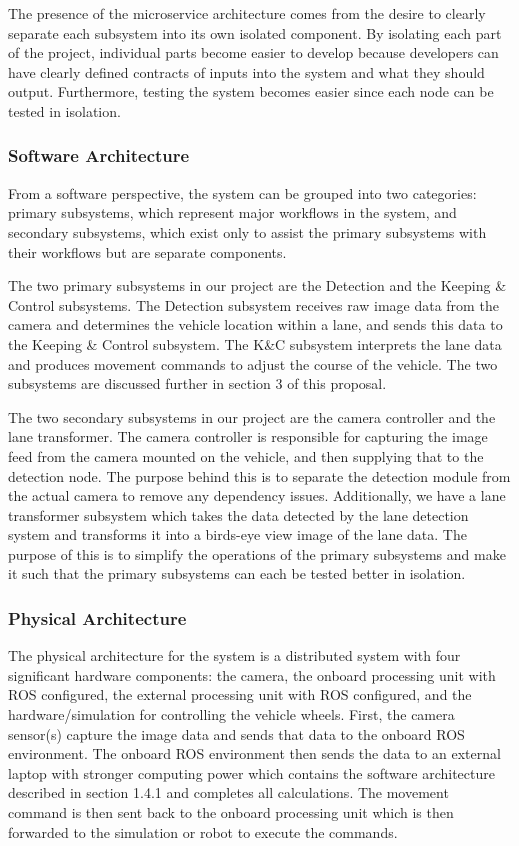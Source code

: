 \documentclass[titlepage]{article}
\begin{document}
The presence of the microservice architecture comes from the desire to clearly separate each subsystem into its own isolated component. By isolating each part of the project, individual parts become easier to develop because developers can have clearly defined contracts of inputs into the system and what they should output. Furthermore, testing the system becomes easier since each node can be tested in isolation.

\subsubsection{Software Architecture}
From a software perspective, the system can be grouped into two categories: primary subsystems, which represent major workflows in the system, and secondary subsystems, which exist only to assist the primary subsystems with their workflows but are separate components.

The two primary subsystems in our project are the Detection and the Keeping \& Control subsystems. The Detection subsystem receives raw image data from the camera and determines the vehicle location within a lane, and sends this data to the Keeping \& Control subsystem. The K\&C subsystem interprets the lane data and produces movement commands to adjust the course of the vehicle. The two subsystems are discussed further in section 3 of this proposal.

The two secondary subsystems in our project are the camera controller and the lane transformer. The camera controller is responsible for capturing the image feed from the camera mounted on the vehicle, and then supplying that to the detection node. The purpose behind this is to separate the detection module from the actual camera to remove any dependency issues. Additionally, we have a lane transformer subsystem which takes the data detected by the lane detection system and transforms it into a birds-eye view image of the lane data. The purpose of this is to simplify the operations of the primary subsystems and make it such that the primary subsystems can each be tested better in isolation.

\subsubsection{Physical Architecture}

The physical architecture for the system is a distributed system with four  significant hardware components: the camera, the onboard processing unit with ROS configured, the external processing unit with ROS configured, and the hardware/simulation for controlling the vehicle wheels. First, the camera sensor(s) capture the image data and sends that data to the onboard ROS environment. The onboard ROS environment then sends the data to an external laptop with stronger computing power which contains the software architecture described in section 1.4.1 and completes all calculations. The movement command is then sent back to the onboard processing unit which is then forwarded to the simulation or robot to execute the commands.
\end{document}
